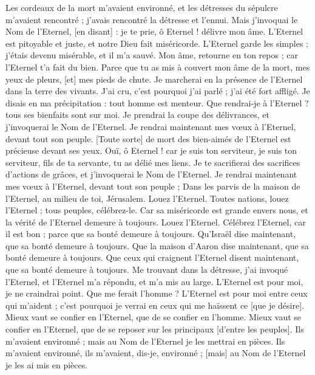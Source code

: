 \begin{multicols}{2}
Les cordeaux de la mort m'avaient environné, et les détresses du sépulcre m'avaient rencontré ; j'avais rencontré la détresse et l'ennui.
Mais j'invoquai le Nom de l’Eternel, [en disant] : je te prie, ô Eternel ! délivre mon âme.
L'Eternel est pitoyable et juste, et notre Dieu fait miséricorde.
L'Eternel garde les simples ; j'étais devenu misérable, et il m'a sauvé.
Mon âme, retourne en ton repos ; car l'Eternel t'a fait du bien.
Parce que tu as mis à couvert mon âme de la mort, mes yeux de pleurs, [et] mes pieds de chute.
Je marcherai en la présence de l'Eternel dans la terre des vivants.
J'ai cru, c'est pourquoi j'ai parlé ; j'ai été fort affligé.
Je disais en ma précipitation : tout homme est menteur.
Que rendrai-je à l'Eternel ? tous ses bienfaits sont sur moi.
Je prendrai la coupe des délivrances, et j'invoquerai le Nom de l’Eternel.
Je rendrai maintenant mes vœux à l'Eternel, devant tout son peuple.
[Toute sorte] de mort des bien-aimés de l'Eternel est précieuse devant ses yeux.
Ouï, ô Eternel ! car je suis ton serviteur, je suis ton serviteur, fils de ta servante, tu as délié mes liens.
Je te sacrifierai des sacrifices d'actions de grâces, et j'invoquerai le Nom de l’Eternel.
Je rendrai maintenant mes vœux à l'Eternel, devant tout son peuple ;
Dans les parvis de la maison de l'Eternel, au milieu de toi, Jérusalem. Louez l'Eternel.
\VerseOne{}Toutes nations, louez l'Eternel ; tous peuples, célébrez-le.
Car sa miséricorde est grande envers nous, et la vérité de l'Eternel demeure à toujours. Louez l'Eternel.
\VerseOne{}Célébrez l'Eternel, car il est bon ; parce que sa bonté demeure à toujours.
Qu'Israël dise maintenant, que sa bonté demeure à toujours.
Que la maison d'Aaron dise maintenant, que sa bonté demeure à toujours.
Que ceux qui craignent l'Eternel disent maintenant, que sa bonté demeure à toujours.
Me trouvant dans la détresse, j'ai invoqué l'Eternel, et l'Eternel m'a répondu, et m'a mis au large.
L'Eternel est pour moi, je ne craindrai point. Que me ferait l'homme ?
L'Eternel est pour moi entre ceux qui m'aident ; c'est pourquoi je verrai en ceux qui me haïssent ce [que je désire].
Mieux vaut se confier en l'Eternel, que de se confier en l'homme.
Mieux vaut se confier en l'Eternel, que de se reposer sur les principaux [d'entre les peuples].
Ils m'avaient environné ; mais au Nom de l'Eternel je les mettrai en pièces.
Ils m'avaient environné, ils m'avaient, dis-je, environné ; [mais] au Nom de l'Eternel je les ai mis en pièces.

\end{multicols}
